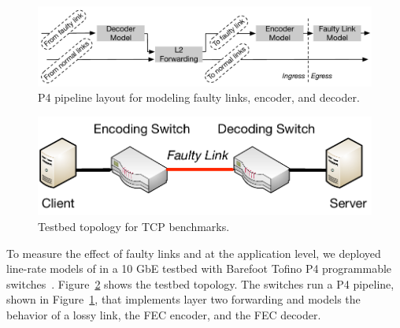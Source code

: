 



\begin{figure}
  \centering
  \includegraphics[width=0.4\paperwidth]{figures/lineRateModel.pdf}
  \caption{\label{fig:lineRateModel} P4 pipeline layout for modeling faulty links, encoder, and decoder.}
\end{figure}

\begin{figure}
  \centering
  \includegraphics[width=0.3\paperwidth]{figures/p4ModelTopo.pdf}
  \caption{\label{fig:p4ModelTopo} Testbed topology for TCP benchmarks.}
\end{figure}

To measure the effect of faulty links and \OurSys at the application level, we 
deployed line-rate models of \OurSys in a 10 GbE testbed with Barefoot 
Tofino P4 programmable switches~\cite{tofino}. Figure~\ref{fig:p4ModelTopo} 
shows the testbed topology. The switches run a P4 pipeline, shown in 
Figure~\ref{fig:lineRateModel}, that implements layer two forwarding 
and models the behavior of a lossy link, the FEC encoder, and the FEC decoder. 


